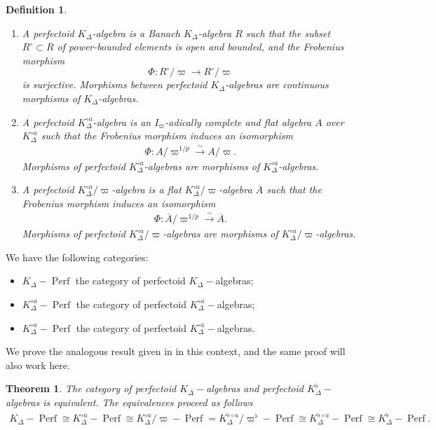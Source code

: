 \documentclass[12pts,a4paper]{amsart}
\newtheorem{definition}[proposition]{Definition}
\newtheorem{theorem}[proposition]{Theorem}
\DeclareMathOperator{\Perf}{Perf}
\begin{document}
\begin{definition}
   \begin{enumerate}
       \item[(i)] A \emph{perfectoid $K_\Delta$-algebra} is a Banach $K_\Delta$-algebra $R$ such that the subset $R^\circ \subset R$ of power-bounded elements is open and bounded, and the Frobenius morphism
		\[
		\Phi: R^\circ /\varpi \to R^\circ /\varpi
		\]
		is surjective. Morphisms between perfectoid $K_\Delta$-algebras are continuous morphisms of $K_\Delta$-algebras.
		
       \item[(ii)] A \emph{perfectoid $K^{\circ a}_\Delta$-algebra} is an $I_\varpi$-adically complete and flat algebra $A$ over $K^{\circ a}_\Delta$ such that the Frobenius morphism induces an isomorphism
        \begin{align*}
            \Phi: A / \varpi^{1/p} \xrightarrow{\sim} A /\varpi.
        \end{align*}
        Morphisms of perfectoid $K^{\circ a}_\Delta$-algebras are morphisms of $K^{\circ a}_\Delta$-algebras.
		
       \item[(iii)] A \emph{perfectoid $K^{\circ a}_\Delta/\varpi$-algebra} is a flat $K^{\circ a}_\Delta/\varpi$-algebra $\overline{A}$ such that the Frobenius morphism induces an isomorphism
        \begin{align*}
            \Phi: \overline{A} / \varpi^{1/p} \xrightarrow{\sim} \overline{A}.
        \end{align*}
        Morphisms of perfectoid $K^{\circ a}_\Delta/\varpi$-algebras are morphisms of $K^{\circ a}_\Delta/\varpi$-algebras.
   \end{enumerate}
\end{definition}

 We have the following categories:
 \begin{itemize}
     \item $K_\Delta-\Perf$ the category of perfectoid $K_\Delta-$algebras;
     \item $K^{\circ a}_\Delta-\Perf$ the category of perfectoid $K^{\circ a}_\Delta-$algebras;
     \item $K^{\circ a}_\Delta-\Perf$ the category of perfectoid $K^{\circ a}_\Delta-$algebras.
 \end{itemize}

   We prove the analogous result given in \cite{Sch} in this context, and the same proof will also work here.
  \begin{theorem}\label{Theorem 6.2}
	The category of perfectoid $K_\Delta-$algebras and perfectoid $K^\flat_\Delta-$algebras is equivalent. The equivalences proceed as follows
    \begin{align*}
        K_\Delta-\Perf\cong K^{\circ a}_\Delta-\Perf\cong K^{\circ a}_\Delta/\varpi-\Perf= K^{\flat\circ a}_\Delta/\varpi^\flat-\Perf\cong K^{\flat\circ a}_\Delta-\Perf\cong K^\flat_\Delta-\Perf.
    \end{align*}	
  \end{theorem}
\end{document}
